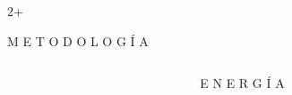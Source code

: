 \documentclass[final]{beamer}
\newlength{\sepwidth}
\newlength{\colwidth}
\newcommand{\separatorcolumn}{\begin{column}{\sepwidth}\end{column}}
\begin{document}
\begin{frame}[t]
\begin{columns}[t]
\begin{column}{2\colwidth+\sepwidth}
\begin{exampleblock}{M E T O D O L O G Í A}{}


			\end{exampleblock}		

		\end{column}

	\end{columns}

	\begin{columns}[t]

		\separatorcolumn
		
		\begin{column}{\colwidth}
			
			\begin{block}{E N E R G Í A}{}


\end{block}
\end{column}
\end{columns}
\end{frame}
\end{document}
